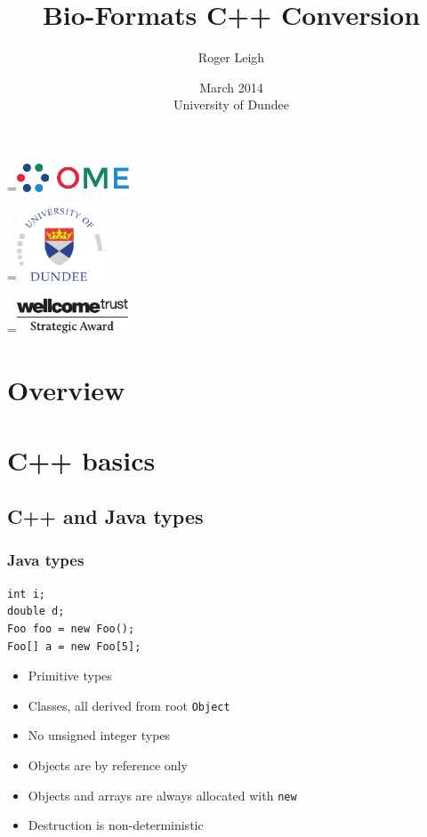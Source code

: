 \documentclass{beamer}
\title{Bio-Formats C++ Conversion}
\author{Roger Leigh}
\date{March 2014\\University of Dundee}
\newcommand*{\vcenteredhbox}[1]{\begingroup
\setbox0=\hbox{#1}\parbox{\wd0}{\box0}\endgroup}
\begin{document}
\begin{frame}[plain]
  \titlepage
  \begin{center}
    \vcenteredhbox{\includegraphics[width=0.25\textwidth]{ome}} \hfill
    \vcenteredhbox{\includegraphics[width=0.2\textwidth]{dundee}}\hfill
    \vcenteredhbox{\includegraphics[width=0.25\textwidth]{wellcome}}
  \end{center}
\end{frame}

\section*{Overview}

\section{C++ basics}
\subsection{C++ and Java types}

\begin{frame}[fragile]
  \frametitle{Java types}
  \begin{lstlisting}[lang=Java]
int i;
double d;
Foo foo = new Foo();
Foo[] a = new Foo[5];
\end{lstlisting}
  \begin{itemize}
  \item Primitive types
  \item Classes, all derived from root \texttt{Object}
  \item No unsigned integer types
  \item Objects are by reference only
  \item Objects and arrays are always allocated with \texttt{new}
  \item Destruction is non-deterministic
  \end{itemize}
\end{frame}
\end{document}

